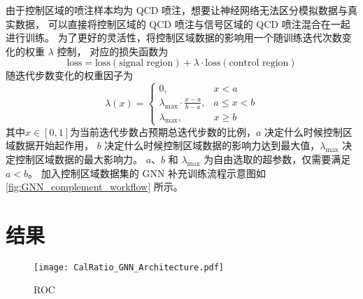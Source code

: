 由于控制区域的喷注样本均为 QCD 喷注，想要让神经网络无法区分模拟数据与真实数据，
可以直接将控制区域的 QCD 喷注与信号区域的 QCD 喷注混合在一起进行训练。
为了更好的灵活性，将控制区域数据的影响用一个随训练迭代次数变化的权重 $\lambda$ 控制，
对应的损失函数为
\begin{equation}
    \text{loss} = \text{loss}(\text{signal region}) + \lambda \cdot \text{loss}(\text{control region})
\end{equation}
随迭代步数变化的权重因子为
\begin{equation}
    \lambda(x) = \begin{cases}
        0,                                    & x < a        \\
        \lambda_{\max} \cdot \frac{x-a}{b-a}, & a \leq x < b \\
        \lambda_{\max},                       & x \geq b
    \end{cases}
\end{equation}
其中$x \in [0, 1]$为当前迭代步数占预期总迭代步数的比例，$a$ 决定什么时候控制区域数据开始起作用，
$b$ 决定什么时候控制区域数据的影响力达到最大值，$\lambda_{\max}$ 决定控制区域数据的最大影响力。
$a$、$b$ 和 $\lambda_{\max}$ 为自由选取的超参数，仅需要满足$a<b$。
加入控制区域数据集的 GNN 补充训练流程示意图如\autoref{fig:GNN_complement_workflow} 所示。


\section{结果}

\begin{figure}[ht]
    \centering
    \texttt{[image: CalRatio\_GNN\_Architecture.pdf]}
    \caption{ROC}
    \label{fig:ROC}
\end{figure}
